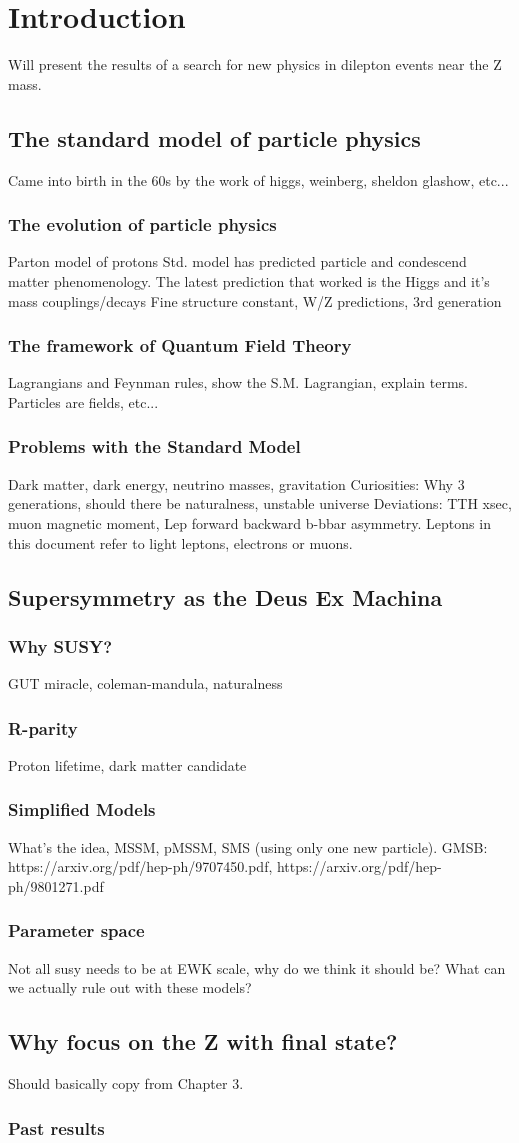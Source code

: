 \chapter{Introduction}
  Will present the results of a search for new physics in dilepton events near the Z mass.
\section{The standard model of particle physics}
  Came into birth in the 60s by the work of higgs, weinberg, sheldon glashow, etc...
  \subsection{The evolution of particle physics}
    Parton model of protons
    Std. model has predicted particle and condescend matter phenomenology. The latest prediction that worked is the Higgs and it's mass couplings/decays
    Fine structure constant, W/Z predictions, 3rd generation
  \subsection{The framework of Quantum Field Theory}
    Lagrangians and Feynman rules, show the S.M. Lagrangian, explain terms. Particles are fields, etc...
  \subsection{Problems with the Standard Model}
    Dark matter, dark energy, neutrino masses, gravitation
    Curiosities: Why 3 generations, should there be naturalness, unstable universe
    Deviations: TTH xsec, muon magnetic moment, Lep forward backward b-bbar asymmetry.
    Leptons in this document refer to light leptons, electrons or muons.
\section{Supersymmetry as the Deus Ex Machina}
  \subsection{Why SUSY?}
    GUT miracle, coleman-mandula, naturalness
  \subsection{R-parity} \label{sec:r-parity}
    Proton lifetime, dark matter candidate
  \subsection{Simplified Models}
    What's the idea, MSSM, pMSSM, SMS (using only one new particle).
    GMSB: https://arxiv.org/pdf/hep-ph/9707450.pdf, https://arxiv.org/pdf/hep-ph/9801271.pdf
  \subsection{Parameter space}
    Not all susy needs to be at EWK scale, why do we think it should be? What can we actually rule out with these models?
\section{Why focus on the Z with \MET final state?}
  Should basically copy from Chapter 3.
  \subsection{Past results}
